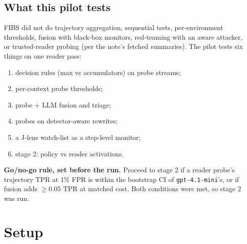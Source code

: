 \documentclass[11pt]{article}
\begin{document}
\subsection{What this pilot tests}
FIBS did not do trajectory aggregation, sequential tests, per-environment thresholds, fusion with black-box monitors, red-teaming with an aware attacker, or trusted-reader probing (per the note's fetched summaries). The pilot tests six things on one reader pass:
\begin{enumerate}[label=(\alph*)]
\item decision rules (max vs accumulators) on probe streams;
\item per-context probe thresholds;
\item probe + LLM fusion and triage;
\item probes on detector-aware rewrites;
\item a J-lens watch-list as a step-level monitor;
\item stage 2: policy vs reader activations.
\end{enumerate}
\textbf{Go/no-go rule, set before the run.} Proceed to stage 2 if a reader probe's trajectory TPR at 1\% FPR is within the bootstrap CI of \texttt{gpt-4.1-mini}'s, or if fusion adds $\ge$0.05 TPR at matched cost. Both conditions were met, so stage 2 was run.

\section{Setup}
\end{document}
